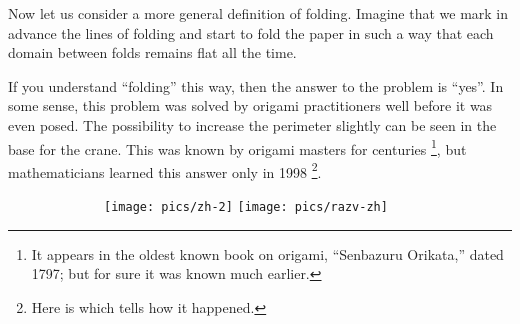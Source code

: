 Now let us consider a more general definition of folding. 
Imagine that we mark in advance the lines of folding and start to fold the paper in such a way that each domain between folds remains flat all the time.

If you understand ``folding'' this way, then the answer to the problem is ``yes''.
In some sense, this problem was solved by origami practitioners well before it was even posed.
The possibility to increase the perimeter slightly 
can be seen in the base for the crane.  This was known by origami masters for centuries%
\footnote{It appears in the oldest known book on origami, ``Senbazuru Orikata,'' dated 1797; but for sure it was known much earlier.},
but mathematicians learned this answer only in 1998%
\footnote{Here is  which tells how it happened.}.

\begin{figure}[h]
\ \ \ \ \ \ \ \ 
\texttt{[image: pics/zh-2]}
\hfill
\texttt{[image: pics/razv-zh]}
\ \ \ \ \ \ \ \ 
\end{figure}



